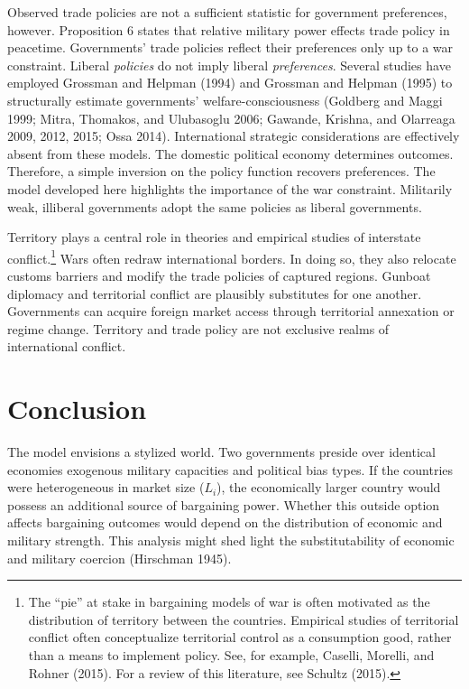 \documentclass{puthesis}
\begin{document}
Observed trade policies are not a sufficient statistic for government
preferences, however. Proposition 6 states that relative military power
effects trade policy in peacetime. Governments' trade policies reflect
their preferences only up to a war constraint. Liberal \emph{policies}
do not imply liberal \emph{preferences}. Several studies have employed
Grossman and Helpman (1994) and Grossman and Helpman (1995) to
structurally estimate governments' welfare-consciousness (Goldberg and
Maggi 1999; Mitra, Thomakos, and Ulubasoglu 2006; Gawande, Krishna, and
Olarreaga 2009, 2012, 2015; Ossa 2014). International strategic
considerations are effectively absent from these models. The domestic
political economy determines outcomes. Therefore, a simple inversion on
the policy function recovers preferences. The model developed here
highlights the importance of the war constraint. Militarily weak,
illiberal governments adopt the same policies as liberal governments.

Territory plays a central role in theories and empirical studies of
interstate conflict.\footnote{The ``pie'' at stake in bargaining models
  of war is often motivated as the distribution of territory between the
  countries. Empirical studies of territorial conflict often
  conceptualize territorial control as a consumption good, rather than a
  means to implement policy. See, for example, Caselli, Morelli, and
  Rohner (2015). For a review of this literature, see Schultz (2015).}
Wars often redraw international borders. In doing so, they also relocate
customs barriers and modify the trade policies of captured regions.
Gunboat diplomacy and territorial conflict are plausibly substitutes for
one another. Governments can acquire foreign market access through
territorial annexation or regime change. Territory and trade policy are
not exclusive realms of international conflict.

\section{Conclusion}

The model envisions a stylized world. Two governments preside over
identical economies exogenous military capacities and political bias
types. If the countries were heterogeneous in market size (\(L_i\)), the
economically larger country would possess an additional source of
bargaining power. Whether this outside option affects bargaining
outcomes would depend on the distribution of economic and military
strength. This analysis might shed light the substitutability of
economic and military coercion (Hirschman 1945).
\end{document}
